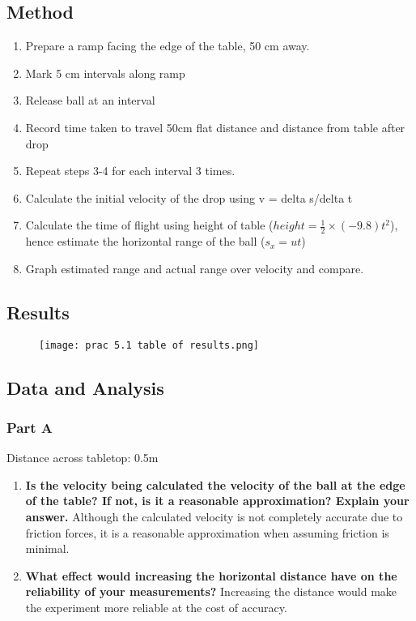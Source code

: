	\subsection{Method}
		\begin{enumerate}
			\item Prepare a ramp facing the edge of the table, 50 cm away.
			\item Mark 5 cm intervals along ramp
			\item Release ball at an interval
			\item Record time taken to travel 50cm flat distance and distance from table after drop
			\item Repeat steps 3-4 for each interval 3 times.
			\item Calculate the initial velocity of the drop using v = delta s/delta t
			\item Calculate the time of flight using height of table ($height=\frac{1}{2}\times (-9.8)t^2$), hence estimate the horizontal range of the ball ($s_{x} = ut$)
			\item Graph estimated range and actual range over velocity and compare.
		\end{enumerate}

	\subsection{Results}
		\begin{figure}[H]
			\centering
			\texttt{[image: prac 5.1 table of results.png]}
		\end{figure}

	\subsection{Data and Analysis}
		\subsubsection{Part A}
			Distance across tabletop: 0.5m
			\begin{enumerate}
				\item \textbf{Is the velocity being calculated the velocity of the ball at the edge of the table? If not, is it a reasonable approximation? Explain your answer.}
					\subitem Although the calculated velocity is not completely accurate due to friction forces, it is a reasonable approximation when assuming friction is minimal.
				\item \textbf{What effect would increasing the horizontal distance have on the reliability of your measurements?}
					\subitem Increasing the distance would make the experiment more reliable at the cost of accuracy.
			\end{enumerate}

